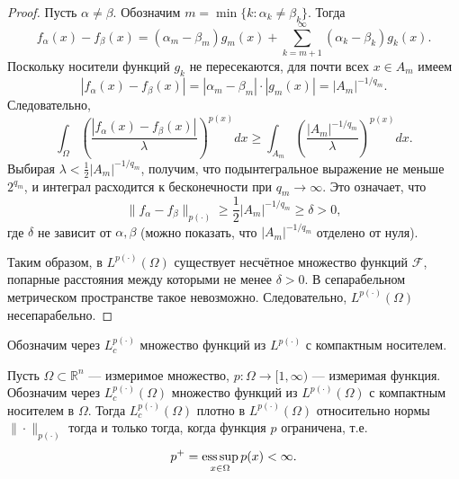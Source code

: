 \documentclass[../NDCNNAI_main.tex]{subfiles}
\begin{document}
\begin{proof}
Пусть \( \alpha \neq \beta \). Обозначим \( m = \min\{ k \colon \alpha_k \neq \beta_k \} \). Тогда
\[
f_\alpha(x) - f_\beta(x) = (\alpha_m - \beta_m) g_m(x) + \sum_{k=m+1}^\infty (\alpha_k - \beta_k) g_k(x).
\]
Поскольку носители функций \( g_k \) не пересекаются, для почти всех \( x \in A_m \) имеем
\[
|f_\alpha(x) - f_\beta(x)| = |\alpha_m - \beta_m| \cdot |g_m(x)| = |A_m|^{-1/q_m}.
\]
Следовательно,
\[
\int_\Omega \left( \frac{|f_\alpha(x) - f_\beta(x)|}{\lambda} \right)^{p(x)} dx
\geq \int_{A_m} \left( \frac{|A_m|^{-1/q_m}}{\lambda} \right)^{p(x)} dx.
\]
Выбирая \( \lambda < \frac{1}{2} |A_m|^{-1/q_m} \), получим, что подынтегральное выражение не меньше \( 2^{q_m} \), и интеграл расходится к бесконечности при \( q_m \to \infty \). Это означает, что
\[
\|f_\alpha - f_\beta\|_{p(\cdot)} \geq \frac{1}{2} |A_m|^{-1/q_m} \geq \delta > 0,
\]
где \( \delta \) не зависит от \( \alpha, \beta \) (можно показать, что \( |A_m|^{-1/q_m} \) отделено от нуля).

Таким образом, в \( L^{p(\cdot)}(\Omega) \) существует несчётное множество функций \( \mathcal{F} \), попарные расстояния между которыми не менее \( \delta > 0 \). В сепарабельном метрическом пространстве такое невозможно. Следовательно, \( L^{p(\cdot)}(\Omega) \) несепарабельно.
\end{proof}

\begin{definition}
Обозначим через \( L_c^{p(\cdot)} \) множество функций из \( L^{p(\cdot)} \) с компактным носителем.
\end{definition}

\begin{theorem}
Пусть \( \Omega \subset \mathbb{R}^n \) --- измеримое множество, \( p \colon \Omega \to [1, \infty) \) --- измеримая функция. Обозначим через \( L_c^{p(\cdot)}(\Omega) \) множество функций из \( L^{p(\cdot)}(\Omega) \) с компактным носителем в \( \Omega \). Тогда \( L_c^{p(\cdot)}(\Omega) \) плотно в \( L^{p(\cdot)}(\Omega) \) относительно нормы \( \|\cdot\|_{p(\cdot)} \) тогда и только тогда, когда функция \( p \) ограничена, т.е.
\[
p^+ = \operatorname*{ess\,sup}_{x \in \Omega} p(x) < \infty.
\]
\end{theorem}
\end{document}
